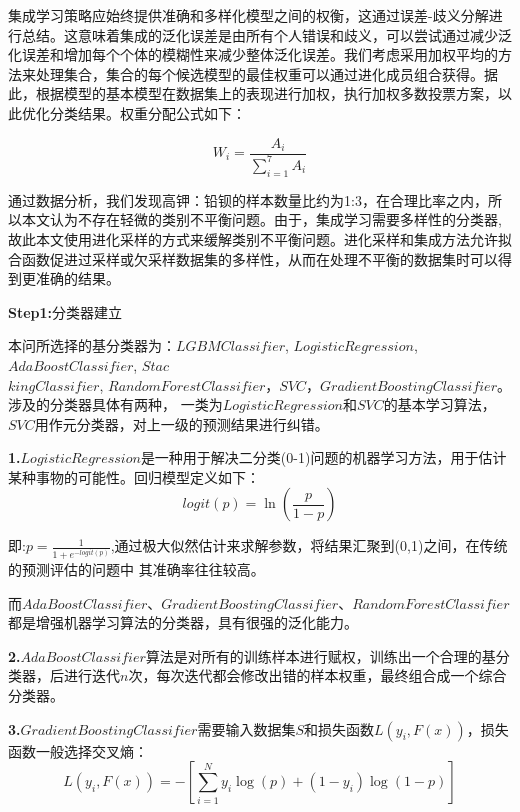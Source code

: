 \documentclass[UTF8]{ctexart}
\begin{document}
集成学习策略应始终提供准确和多样化模型之间的权衡，这通过误差-歧义分解进行总结。这意味着集成的泛化误差是由所有个人错误和歧义，可以尝试通过减少泛化误差和增加每个个体的模糊性来减少整体泛化误差。我们考虑采用加权平均的方法来处理集合，集合的每个候选模型的最佳权重可以通过进化成员组合获得。据此，根据模型的基本模型在数据集上的表现进行加权，执行加权多数投票方案，以此优化分类结果。权重分配公式如下：

\begin{equation}
    W_i = \frac{A_i}{\sum_{i=1}^7 A_i}
\end{equation}

通过数据分析，我们发现高钾：铅钡的样本数量比约为1:3，在合理比率之内，所以本文认为不存在轻微的类别不平衡问题。由于，集成学习需要多样性的分类器,故此本文使用进化采样的方式来缓解类别不平衡问题。进化采样和集成方法允许拟合函数促进过采样或欠采样数据集的多样性，从而在处理不平衡的数据集时可以得到更准确的结果。

\textbf{Step1:}分类器建立

本问所选择的基分类器为：$LGBMClassifier$, $LogisticRegression$, $AdaBoostClassifier$, $Stac$  \\
$kingClassifier$, $RandomForestClassifier$，$SVC$，$GradientBoostingClassifier$。涉及的分类器具体有两种，
一类为$LogisticRegression$和$SVC$的基本学习算法，$SVC$用作元分类器，对上一级的预测结果进行纠错。

\textbf{1.}$LogisticRegression$是一种用于解决二分类(0-1)问题的机器学习方法，用于估计某种事物的可能性。回归模型定义如下：
\begin{equation}
    logit (p) = \ln (\frac{p}{1-p})
\end{equation}

即:$p = \frac{1}{1+e^{-logit (p)}}$,通过极大似然估计来求解参数，将结果汇聚到(0,1)之间，在传统的预测评估的问题中
其准确率往往较高。

而$AdaBoostClassifier$、$GradientBoostingClassifier$、$RandomForestClassifier$都是增强机器学习算法的分类器，具有很强的泛化能力。

\textbf{2.}$AdaBoostClassifier$算法是对所有的训练样本进行赋权，训练出一个合理的基分类器，后进行迭代$n$次，每次迭代都会修改出错的样本权重，最终组合成一个综合分类器。

\textbf{3.}$GradientBoostingClassifier$需要输入数据集$S$和损失函数$L(y_i,F(x))$，损失函数一般选择交叉熵：
\begin{equation}
    L(y_i,F(x)) = -[\sum_{i=1}^N y_i \log (p)+(1-y_i) \log (1-p)]
\end{equation}
\end{document}
